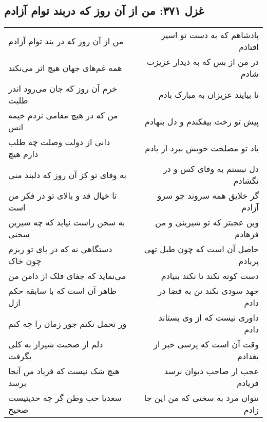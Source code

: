 \begin{center}
\section*{غزل ۳۷۱: من از آن روز که دربند توام آزادم}
\label{sec:371}
\begin{longtable}{l p{0.5cm} r}
من از آن روز که در بند توام آزادم
&&
پادشاهم که به دست تو اسیر افتادم
\\
همه غم‌های جهان هیچ اثر می‌نکند
&&
در من از بس که به دیدار عزیزت شادم
\\
خرم آن روز که جان می‌رود اندر طلبت
&&
تا بیایند عزیزان به مبارک بادم
\\
من که در هیچ مقامی نزدم خیمه انس
&&
پیش تو رخت بیفکندم و دل بنهادم
\\
دانی از دولت وصلت چه طلب دارم هیچ
&&
یاد تو مصلحت خویش ببرد از یادم
\\
به وفای تو کز آن روز که دلبند منی
&&
دل نبستم به وفای کس و در نگشادم
\\
تا خیال قد و بالای تو در فکر من است
&&
گر خلایق همه سروند چو سرو آزادم
\\
به سخن راست نیاید که چه شیرین سخنی
&&
وین عجبتر که تو شیرینی و من فرهادم
\\
دستگاهی نه که در پای تو ریزم چون خاک
&&
حاصل آن است که چون طبل تهی پربادم
\\
می‌نماید که جفای فلک از دامن من
&&
دست کوته نکند تا نکند بنیادم
\\
ظاهر آن است که با سابقه حکم ازل
&&
جهد سودی نکند تن به قضا در دادم
\\
ور تحمل نکنم جور زمان را چه کنم
&&
داوری نیست که از وی بستاند دادم
\\
دلم از صحبت شیراز به کلی بگرفت
&&
وقت آن است که پرسی خبر از بغدادم
\\
هیچ شک نیست که فریاد من آنجا برسد
&&
عجب ار صاحب دیوان نرسد فریادم
\\
سعدیا حب وطن گر چه حدیثیست صحیح
&&
نتوان مرد به سختی که من این جا زادم
\\
\end{longtable}
\end{center}
